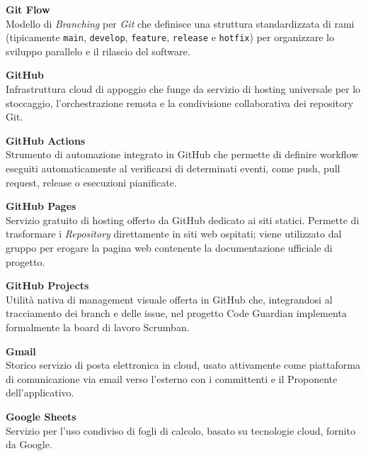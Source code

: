 \documentclass[12pt, a4paper]{article}
\begin{document}
\noindent\hypertarget{git-flow}{\textbf{Git Flow}} \\[0.1em]
Modello di \textit{Branching} per \textit{Git} che definisce una struttura standardizzata di rami (tipicamente \texttt{main}, \texttt{develop}, \texttt{feature}, \texttt{release} e \texttt{hotfix}) per organizzare lo sviluppo parallelo e il rilascio del software.
\vspace{0.5cm}

\noindent\hypertarget{github}{\textbf{GitHub}} \\[0.1em]
Infrastruttura cloud di appoggio che funge da servizio di hosting universale per lo stoccaggio, l'orchestrazione remota e la condivisione collaborativa dei repository Git.
\vspace{0.5cm}

\noindent\hypertarget{github-actions}{\textbf{GitHub Actions}} \\[0.1em]
Strumento di automazione integrato in GitHub che permette di definire workflow eseguiti automaticamente al verificarsi di determinati eventi, come push, pull request, release o esecuzioni pianificate.
\vspace{0.5cm}

\noindent\hypertarget{github-pages}{\textbf{GitHub Pages}} \\[0.1em]
Servizio gratuito di hosting offerto da GitHub dedicato ai siti statici. Permette di trasformare i \textit{Repository} direttamente in siti web ospitati; viene utilizzato dal gruppo per erogare la pagina web contenente la documentazione ufficiale di progetto.
\vspace{0.5cm}  

\noindent\hypertarget{github-projects}{\textbf{GitHub Projects}} \\[0.1em]
Utilità nativa di management visuale offerta in GitHub che, integrandosi al tracciamento dei branch e delle issue, nel progetto Code Guardian implementa formalmente la board di lavoro Scrumban.
\vspace{0.5cm}

\noindent\hypertarget{gmail}{\textbf{Gmail}} \\[0.1em]
Storico servizio di posta elettronica in cloud, usato attivamente come piattaforma di comunicazione via email verso l'esterno con i committenti e il Proponente dell'applicativo.
\vspace{0.5cm}

\noindent\hypertarget{google-sheets}{\textbf{Google Sheets}} \\[0.1em]
Servizio per l'uso condiviso di fogli di calcolo, basato su tecnologie cloud, fornito da Google.
\vspace{0.5cm}
\end{document}
